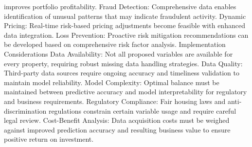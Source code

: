 \documentclass[8pt, twocolumn]{extarticle}
\begin{document}
improves portfolio profitability. Fraud Detection: Comprehensive data
enables identification of unusual patterns that may indicate fraudulent
activity. Dynamic Pricing: Real-time risk-based pricing adjustments
become feasible with enhanced data integration. Loss Prevention:
Proactive risk mitigation recommendations can be developed based on
comprehensive risk factor analysis. Implementation Considerations Data
Availability: Not all proposed variables are available for every
property, requiring robust missing data handling strategies. Data
Quality: Third-party data sources require ongoing accuracy and
timeliness validation to maintain model reliability. Model Complexity:
Optimal balance must be maintained between predictive accuracy and model
interpretability for regulatory and business requirements. Regulatory
Compliance: Fair housing laws and anti-discrimination regulations
constrain certain variable usage and require careful legal review.
Cost-Benefit Analysis: Data acquisition costs must be weighed against
improved prediction accuracy and resulting business value to ensure
positive return on investment.


    
    
    
\end{document}
